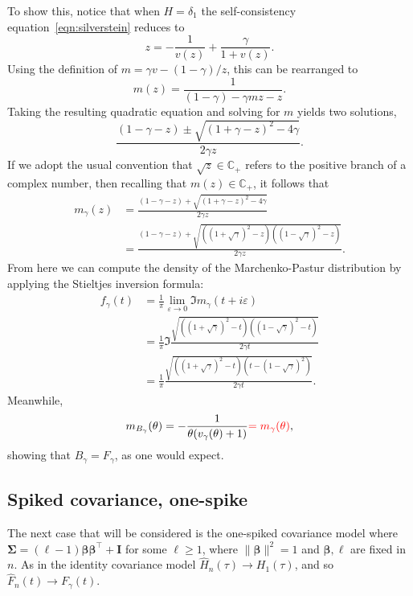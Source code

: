 \documentclass{article}
\newcommand{\bbeta}{\boldsymbol{\beta}}
\newcommand{\bSigma}{\boldsymbol{\Sigma}}
\newcommand{\bI}{\boldsymbol{I}}
\begin{document}
To show this, notice that when $H = \delta_1$ the self-consistency equation~\eqref{eqn:silverstein} reduces to
$$
z = -\frac{1}{v(z)} + \frac{\gamma}{1 + v(z)}.
$$
Using the definition of $m = \gamma v - (1 - \gamma)/z$, this can be rearranged to 
$$
m(z)= \frac{1}{(1 - \gamma) - \gamma m z - z}.
$$
Taking the resulting quadratic equation and solving for $m$ yields two solutions, 
$$
\frac{(1 - \gamma - z) \pm \sqrt{(1 + \gamma - z)^2 - 4 \gamma}}{2 \gamma z}.
$$
If we adopt the usual convention that $\sqrt{z} \in \mathbb{C}_{+}$ refers to the positive branch of a complex number, then recalling that $m(z) \in \mathbb{C}_{+}$, it follows that 
\begin{align*}
m_{\gamma}(z) 
& = \frac{(1 - \gamma - z) + \sqrt{(1 + \gamma - z)^2 - 4 \gamma}}{2 \gamma z} \\
& = \frac{(1 - \gamma - z) + \sqrt{( (1 + \sqrt{\gamma})^2 - z)((1 - \sqrt{\gamma})^2 - z)}}{2 \gamma z}.
\end{align*}
From here we can compute the density of the Marchenko-Pastur distribution by applying the Stieltjes inversion formula:
\begin{align*}
f_{\gamma}(t) 
& = \frac{1}{\pi}\lim_{\varepsilon \to 0} \Im m_{\gamma}(t + i \varepsilon) \\
& = \frac{1}{\pi} \Im \frac{\sqrt{( (1 + \sqrt{\gamma})^2 - t)((1 - \sqrt{\gamma})^2 - t)}}{2 \gamma t} \\
& = \frac{1}{\pi} \frac{\sqrt{( (1 + \sqrt{\gamma})^2 - t)(t - (1 - \sqrt{\gamma})^2)}}{2 \gamma t}.
\end{align*}
Meanwhile,
$$
m_{B_{\gamma}}(\theta) = -\frac{1}{\theta(v_{\gamma}(\theta) + 1)} \textcolor{red}{= m_{\gamma}(\theta)}, 
$$
showing that $B_{\gamma} = F_{\gamma}$, as one would expect.

\subsection{Spiked covariance, one-spike}
The next case that will be considered is the one-spiked covariance model where $\bSigma = (\ell - 1) \bbeta \bbeta^{\top} + \bI$ for some $\ell \geq 1$, where $\|\bbeta\|^2 = 1$ and $\bbeta, \ell$ are fixed in $n$. As in the identity covariance model $\hat{H}_n(\tau) \to H_1(\tau)$, and so $\hat{F}_n(t) \to F_{\gamma}(t)$. 
\end{document}
